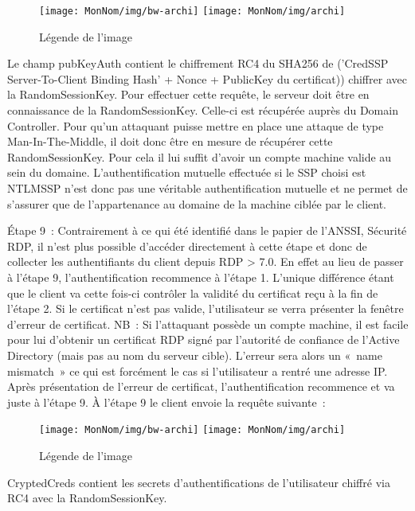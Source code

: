 \begin{figure}[ht]
  \centering
  \ifssticbw
    \texttt{[image: MonNom/img/bw-archi]}
  \else
    \texttt{[image: MonNom/img/archi]}
  \fi
  \caption{Légende de l'image}
  \label{fig:monnom:archi}
\end{figure}

Le champ pubKeyAuth contient le chiffrement RC4 du SHA256 de (’CredSSP Server-To-Client Binding Hash’ + Nonce + PublicKey du certificat)) chiffrer avec la RandomSessionKey.
Pour effectuer cette requête, le serveur doit être en connaissance de la RandomSessionKey. Celle-ci est récupérée auprès du Domain Controller. Pour qu’un attaquant puisse mettre en place une attaque de type Man-In-The-Middle, il doit donc être en mesure de récupérer cette RandomSessionKey. Pour cela il lui suffit d’avoir un compte machine valide au sein du domaine.
L’authentification mutuelle effectuée si le SSP choisi est NTLMSSP n’est donc pas une véritable authentification mutuelle et ne permet de s'assurer que de l'appartenance au domaine de la machine ciblée par le client.

Étape 9 :
Contrairement à ce qui été identifié dans le papier de l’ANSSI, Sécurité RDP, il n’est plus possible d’accéder directement à cette étape et donc de collecter les authentifiants du client depuis RDP > 7.0.
En effet au lieu de passer à l’étape 9, l’authentification recommence à l’étape 1. L'unique différence étant que le client va cette fois-ci contrôler la validité du certificat reçu à la fin de l’étape 2. Si le certificat n'est pas valide, l'utilisateur se verra présenter la fenêtre d'erreur de certificat.
NB : Si l’attaquant possède un compte machine, il est facile pour lui d’obtenir un certificat RDP signé par l’autorité de confiance de l’Active Directory (mais pas au nom du serveur cible). L’erreur sera alors un « name mismatch » ce qui est forcément le cas si l’utilisateur a rentré une adresse IP.
Après présentation de l’erreur de certificat, l’authentification recommence et va juste à l’étape 9.
À l’étape 9 le client envoie la requête suivante :

\begin{figure}[ht]
  \centering
  \ifssticbw
    \texttt{[image: MonNom/img/bw-archi]}
  \else
    \texttt{[image: MonNom/img/archi]}
  \fi
  \caption{Légende de l'image}
  \label{fig:monnom:archi}
\end{figure}

CryptedCreds contient les secrets d’authentifications de l’utilisateur chiffré via RC4 avec la RandomSessionKey.

